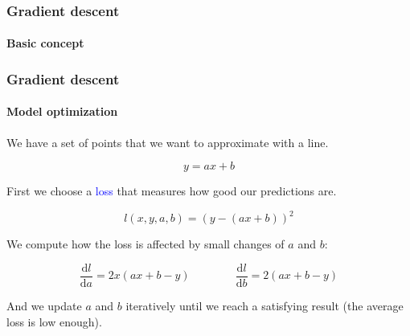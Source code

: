 \documentclass[9pt]{beamer}
\begin{document}
\begin{frame}
  \frametitle{Gradient descent}

  \framesubtitle{Basic concept}

  \begin{center}
    \scalebox{0.9}{
      
    }
  \end{center}

\end{frame}

\begin{frame}
  \frametitle{Gradient descent}

  \framesubtitle{Model optimization}

  \begin{center}
    \scalebox{0.5}{
      
    }
  \end{center}

  We have a set of points that we want to approximate with a line.

  \[
  y = ax + b
  \]

  \pause

  First we choose a \textcolor{blue}{loss} that measures how good our
  predictions are.

  \[
  l(x, y, a, b) = (y - (a x + b))^{2}
  \]

  \pause

  We compute how the loss is affected by small changes of $a$ and
  $b$:

  \[
  \frac{\mathrm{d}l}{\mathrm{d}a} = 2 x (ax + b - y) \qquad \qquad \frac{\mathrm{d}l}{\mathrm{d}b} = 2 (ax + b - y)
  \]

  And we update $a$ and $b$ iteratively until we reach a satisfying
  result (the average loss is low enough).

\end{frame}
\end{document}
